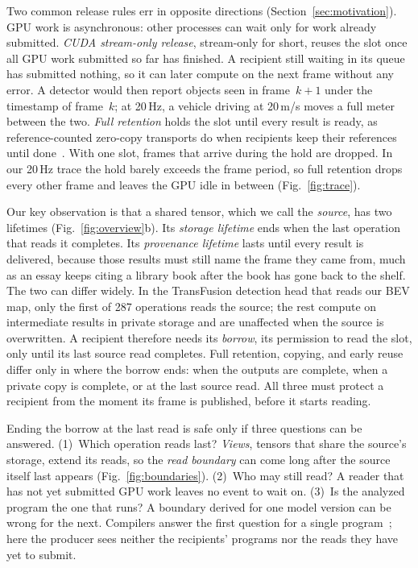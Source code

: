 \documentclass[conference]{IEEEtran}
\newcommand{\Hz}{\,Hz}
\begin{document}
Two common release rules err in opposite directions (Section~\ref{sec:motivation}). GPU work is asynchronous: other processes can wait only for work already submitted. \emph{CUDA stream-only release}, stream-only for short, reuses the slot once all GPU work submitted so far has finished. A recipient still waiting in its queue has submitted nothing, so it can later compute on the next frame without any error. A detector would then report objects seen in frame~$k{+}1$ under the timestamp of frame~$k$; at 20\Hz, a vehicle driving at 20\,m/s moves a full meter between the two. \emph{Full retention} holds the slot until every result is ready, as reference-counted zero-copy transports do when recipients keep their references until done~\cite{iceoryx,agnocast}. With one slot, frames that arrive during the hold are dropped. In our 20\Hz{} trace the hold barely exceeds the frame period, so full retention drops every other frame and leaves the GPU idle in between (Fig.~\ref{fig:trace}).

Our key observation is that a shared tensor, which we call the \emph{source}, has two lifetimes (Fig.~\ref{fig:overview}b). Its \emph{storage lifetime} ends when the last operation that reads it completes. Its \emph{provenance lifetime} lasts until every result is delivered, because those results must still name the frame they came from, much as an essay keeps citing a library book after the book has gone back to the shelf. The two can differ widely. In the TransFusion detection head that reads our BEV map, only the first of 287 operations reads the source; the rest compute on intermediate results in private storage and are unaffected when the source is overwritten. A recipient therefore needs its \emph{borrow}, its permission to read the slot, only until its last source read completes. Full retention, copying, and early reuse differ only in where the borrow ends: when the outputs are complete, when a private copy is complete, or at the last source read. All three must protect a recipient from the moment its frame is published, before it starts reading.

Ending the borrow at the last read is safe only if three questions can be answered. (1)~Which operation reads last? \emph{Views}, tensors that share the source's storage, extend its reads, so the \emph{read boundary} can come long after the source itself last appears (Fig.~\ref{fig:boundaries}). (2)~Who may still read? A reader that has not yet submitted GPU work leaves no event to wait on. (3)~Is the analyzed program the one that runs? A boundary derived for one model version can be wrong for the next. Compilers answer the first question for a single program~\cite{tvm,nll}; here the producer sees neither the recipients' programs nor the reads they have yet to submit.
\end{document}

